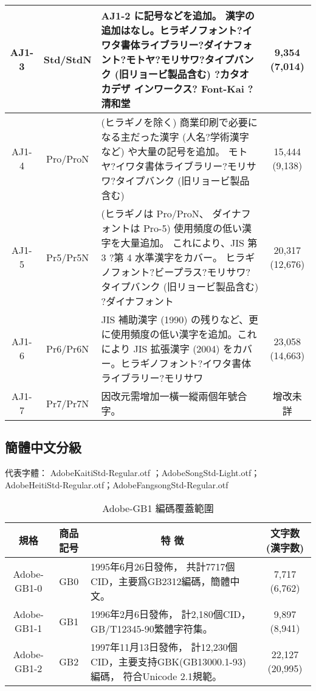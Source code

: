 \begin{appendix}
\begin{table}[h]
\begin{tabular}{|c|c|p{8cm}|c|}
AJ1-3	& Std/StdN	&   AJ1-2 に記号などを追加。
漢字の追加はなし。ヒラギノフォント?イワタ書体ライブラリー?ダイナフォ
ント?モトヤ?モリサワ?タイプバンク (旧リョービ製品含む) ?カタオカデザ
インワークス? Font-Kai ?清和堂 & 9,354 (7,014) \\

\hline
AJ1-4	& Pro/ProN &
(ヒラギノを除く)	商業印刷で必要になる主だった漢字
(人名?学術漢字など) や大量の記号を追加。
モトヤ?イワタ書体ライブラリー?モリサワ?タイプバンク
(旧リョービ製品含む)  & 15,444 (9,138) \\
\hline
AJ1-5	& Pr5/Pr5N &
(ヒラギノは Pro/ProN、
ダイナフォントは Pro-5)	使用頻度の低い漢字を大量追加。
これにより、JIS 第 3 ?第 4 水準漢字をカバー。
ヒラギノフォント?ビープラス?モリサワ?タイプバンク
(旧リョービ製品含む) ?ダイナフォント  & 20,317 (12,676) \\

\hline
AJ1-6	& Pr6/Pr6N	&  JIS 補助漢字 (1990)
の残りなど、更に使用頻度の低い漢字を追加。これにより JIS 拡張漢字
(2004) をカバー。ヒラギノフォント?イワタ書体ライブラリー?モリサワ
& 23,058 (14,663) \\

\hline
AJ1-7	& Pr7/Pr7N	&  因改元需增加一橫一縱兩個年號合字。 & 增改未詳 \\

\hline %
\end{tabular}

\end{table}

\clearpage
\subsection{簡體中文分級}
{\gtfamily 代表字體： AdobeKaitiStd-Regular.otf ；AdobeSongStd-Light.otf；\\
\qquad \qquad \qquad AdobeHeitiStd-Regular.otf；AdobeFangsongStd-Regular.otf}
\begin{table}[h]
\caption{\fontsize{12pt}{15pt}\selectfont Adobe-GB1 編碼覆蓋範圍} %
\centering %
\begin{tabular}{|c|c|p{8cm}|c|}%
\hline  %

規格 & 商品記号	& \multicolumn{1}{|c|}{特 徴} & 文字数(漢字数) \\

\hline  %
Adobe-GB1-0 &	GB0	 & 1995年6月26日發佈，
共計7717個CID，主要爲GB2312編碼，簡體中文。
& 7,717 (6,762) \\
\hline
Adobe-GB1-1	& GB1 &	1996年2月6日發佈，
計2,180個CID，GB/T12345-90繁體字符集。
& 	9,897 (8,941) \\
\hline
Adobe-GB1-2	& GB2	 &  1997年11月13日發佈，
計12,230個CID，主要支持GBK(GB13000.1-93)編碼，
符合Unicode 2.1規範。 & 22,127 (20,995) \\
\hline


\end{tabular}
\end{table}
\end{appendix}
